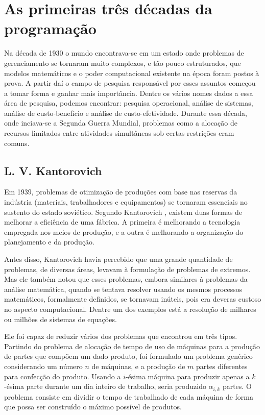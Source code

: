 
\section{As primeiras três décadas da programação}

\noindent
Na década de 1930 o mundo encontrava-se em um estado onde problemas de gerenciamento
se tornaram muito complexos, e tão pouco estruturados, que modelos matemáticos e o poder
computacional existente na época foram postos à prova. A partir daí o campo de
pesquisa responsável por esses assuntos começou a tomar forma e ganhar mais importância.
Dentre os vários nomes dados a essa área de pesquisa, podemos encontrar: pesquisa operacional,
análise de sistemas, análise de custo-benefício e análise de custo-efetividade. Durante essa
década, onde inciava-se a Segunda Guerra Mundial, problemas como a alocação de recursos
limitados entre atividades simultâneas sob certas restrições eram comuns.


\subsection{L. V. Kantorovich}
\label{sec_kantorovich}

\noindent
Em 1939, problemas de otimização de produções com base nas reservas da indústria (materiais,
trabalhadores e equipamentos) se tornaram essenciais no sustento do estado soviético.
Segundo Kantorovich \cite{kantorovich1939}, existem duas formas de melhorar a eficiência
de uma fábrica. A primeira é melhorando a tecnologia empregada nos meios de produção, e a
outra é melhorando a organização do planejamento e da produção.

Antes disso, Kantorovich havia percebido que uma grande quantidade de problemas, de diversas
áreas, levavam à formulação de problemas de extremos. Mas ele também notou que esses problemas,
embora similares à problemas da análise matemática, quando se tentava resolver
usando os mesmos processos matemáticos, formalmente definidos, se tornavam inúteis, pois era
deveras custoso no aspecto computacional. Dentre um dos exemplos está a resolução de milhares
ou milhões de sistemas de equações.

Ele foi capaz de reduzir vários dos problemas que encontrou em três tipos.
Partindo do problema de alocação de tempo de uso de máquinas para a produção de partes que compõem
um dado produto, foi formulado um problema genérico considerando um número
\(n\) de máquinas, e a produção de \(m\) partes diferentes para confecção do produto. Usando
a \(i\)-ésima máquina para produzir apenas a \(k\)-ésima parte durante um dia inteiro de trabalho,
seria produzido \(\alpha_{i, k}\) partes. O problema consiste em dividir o tempo de trabalhado de cada
máquina de forma que possa ser construído o máximo possível de produtos.


